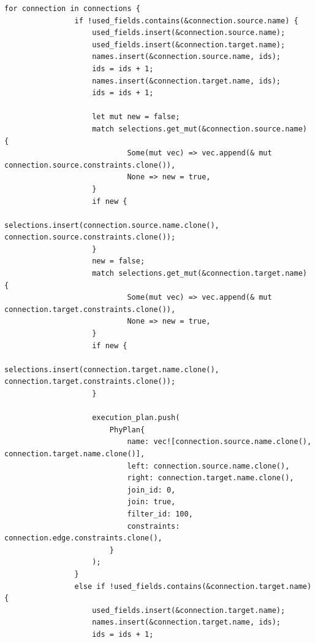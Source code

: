 \documentclass[11pt,singlecolumn]{scrartcl}
\begin{document}
\begin{lstlisting}
for connection in connections {
                if !used_fields.contains(&connection.source.name) {
                    used_fields.insert(&connection.source.name);
                    used_fields.insert(&connection.target.name);
                    names.insert(&connection.source.name, ids);
                    ids = ids + 1;
                    names.insert(&connection.target.name, ids);
                    ids = ids + 1;

                    let mut new = false;
                    match selections.get_mut(&connection.source.name) {
                            Some(mut vec) => vec.append(& mut connection.source.constraints.clone()),
                            None => new = true,
                    }
                    if new {
                            selections.insert(connection.source.name.clone(), connection.source.constraints.clone());
                    }
                    new = false;
                    match selections.get_mut(&connection.target.name) {
                            Some(mut vec) => vec.append(& mut connection.target.constraints.clone()),
                            None => new = true,
                    }
                    if new {
                            selections.insert(connection.target.name.clone(), connection.target.constraints.clone());
                    }

                    execution_plan.push(
                        PhyPlan{ 
                            name: vec![connection.source.name.clone(), connection.target.name.clone()],
                            left: connection.source.name.clone(),
                            right: connection.target.name.clone(),
                            join_id: 0,
                            join: true,
                            filter_id: 100,
                            constraints: connection.edge.constraints.clone(),
                        }
                    );
                }
                else if !used_fields.contains(&connection.target.name) {
                    used_fields.insert(&connection.target.name);
                    names.insert(&connection.target.name, ids);
                    ids = ids + 1;


\end{lstlisting}
\end{document}
